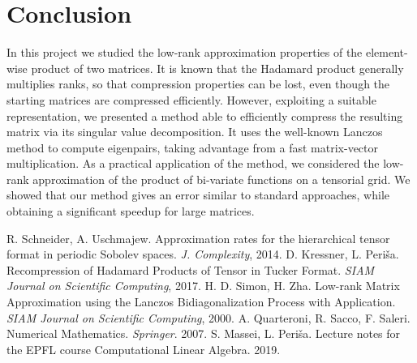 \documentclass[10pt,titlepage]{article}
\numberwithin{equation}{section}
\numberwithin{figure}{section}
\begin{document}
\section{Conclusion}
In this project we studied the low-rank approximation properties of the element-wise product of two matrices. It is known that the Hadamard product generally multiplies ranks, so that compression properties can be lost, even though the starting matrices are compressed efficiently. However, exploiting a suitable representation, we presented a method able to efficiently compress the resulting matrix via its singular value decomposition. It uses the well-known Lanczos method to compute eigenpairs, taking advantage from a fast matrix-vector multiplication. As a practical application of the method, we considered the low-rank approximation of the product of bi-variate functions on a tensorial grid. We showed that our method gives an error similar to standard approaches, while obtaining a significant speedup for large matrices.



\begin{thebibliography}{}
	 R. Schneider, A. Uschmajew. Approximation rates for the hierarchical tensor format in periodic Sobolev spaces. \textit{J. Complexity}, 2014.
	 D. Kressner, L. Periša. Recompression of Hadamard Products of Tensor in Tucker Format. \textit{SIAM Journal on Scientific Computing}, 2017.
	 H. D. Simon, H. Zha. Low-rank Matrix Approximation using the Lanczos Bidiagonalization Process with Application. \textit{SIAM Journal on Scientific Computing}, 2000.
	 A. Quarteroni, R. Sacco, F. Saleri. Numerical Mathematics. \textit{Springer}. 2007.
	 S. Massei, L. Periša. Lecture notes for the EPFL course Computational Linear Algebra. 2019.
\end{thebibliography}
\end{document}
